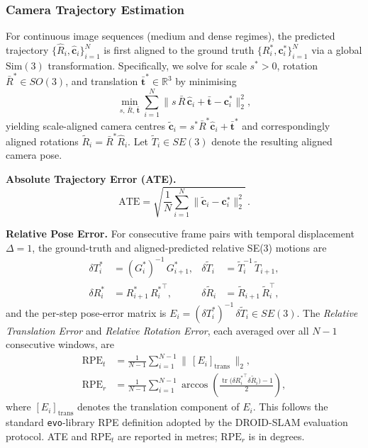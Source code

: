 \documentclass{llmxive}
\begin{document}
\subsubsection{Camera Trajectory Estimation}
\label{appendix:metrics:traj}

For continuous image sequences (medium and dense regimes), the predicted trajectory $\{\hat{R}_i,\hat{\mathbf{c}}_i\}_{i=1}^{N}$ is first aligned to the ground truth $\{R_i^{*},\mathbf{c}_i^{*}\}_{i=1}^{N}$ via a global $\mathrm{Sim}(3)$ transformation.
%
Specifically, we solve for scale $s^{*}\!>0$, rotation $\bar{R}^{*}\!\in SO(3)$, and translation $\bar{\mathbf{t}}^{*}\!\in\mathbb{R}^{3}$ by minimising
\begin{equation}
  \min_{s,\,\bar{R},\,\bar{\mathbf{t}}}
  \sum_{i=1}^{N}
  \bigl\|s\,\bar{R}\,\hat{\mathbf{c}}_i + \bar{\mathbf{t}} - \mathbf{c}_i^{*}\bigr\|_2^2,
  \label{eq:sim3_align}
\end{equation}
yielding scale-aligned camera centres
$\tilde{\mathbf{c}}_i = s^{*}\bar{R}^{*}\hat{\mathbf{c}}_i + \bar{\mathbf{t}}^{*}$ and correspondingly aligned rotations $\tilde{R}_i = \bar{R}^{*}\hat{R}_i$. Let $\tilde{T}_i\in SE(3)$ denote the resulting aligned camera pose.

\textbf{Absolute Trajectory Error (ATE).}
\begin{equation}
  \mathrm{ATE}
  = \sqrt{\frac{1}{N}\sum_{i=1}^{N}
    \bigl\|\tilde{\mathbf{c}}_i - \mathbf{c}_i^{*}\bigr\|_2^2}\,.
  \label{eq:ate}
\end{equation}

\textbf{Relative Pose Error.}
For consecutive frame pairs with temporal displacement $\Delta=1$, the ground-truth and aligned-predicted relative SE(3) motions are
\begin{align}
  \delta T_i^{*}    &= (G_i^{*})^{-1}\,G_{i+1}^{*},
  &\delta\tilde{T}_i &= \tilde{T}_i^{-1}\,\tilde{T}_{i+1},\\
  \delta R_i^{*}    &= R_{i+1}^{*}\,{R_i^{*}}^{\!\top},
  &\delta\tilde{R}_i &= \tilde{R}_{i+1}\,\tilde{R}_i^{\top},
\end{align}
and the per-step pose-error matrix is $E_i = (\delta T_i^{*})^{-1}\,\delta\tilde{T}_i \in SE(3)$.
The \emph{Relative Translation Error} and \emph{Relative Rotation Error}, each averaged over all $N\!-\!1$ consecutive windows, are
\begin{align}
  \mathrm{RPE}_{t}
  &= \frac{1}{N-1}\sum_{i=1}^{N-1}
    \bigl\|\,[E_i]_{\mathrm{trans}}\,\bigr\|_2,
  \label{eq:rpet}\\
  \mathrm{RPE}_{r}
  &= \frac{1}{N-1}\sum_{i=1}^{N-1}
    \arccos\!\left(\frac{\operatorname{tr}\!\bigl({\delta R_i^{*}}^{\!\top}\delta\tilde{R}_i\bigr)-1}{2}\right),
  \label{eq:rper}
\end{align}
where $[E_i]_{\mathrm{trans}}$ denotes the translation component of $E_i$. This follows the standard \texttt{evo}-library RPE definition adopted by the DROID-SLAM evaluation protocol.
ATE and $\mathrm{RPE}_{t}$ are reported in metres; $\mathrm{RPE}_{r}$ is in degrees.
\end{document}
